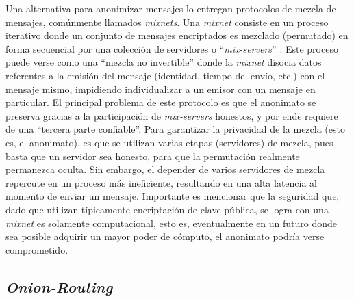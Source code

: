 Una alternativa para anonimizar mensajes lo entregan protocolos de mezcla de mensajes, comúnmente llamados \emph{mixnets}. 
Una \emph{mixnet} consiste en un proceso iterativo donde un conjunto de mensajes encriptados es mezclado (permutado) en forma 
secuencial por una colección de servidores o ``\emph{mix-servers}'' \cite{chaum1981untraceable}. Este proceso puede verse como una 
``mezcla no invertible'' donde la \emph{mixnet} disocia datos referentes a la emisión del 
mensaje (identidad, tiempo del envío, etc.) con el mensaje mismo, impidiendo individualizar a un emisor con un mensaje en particular. 
El principal problema de este protocolo es que el anonimato se preserva gracias a la participación de \emph{mix-servers} honestos, 
y por ende requiere de una ``tercera parte confiable''. 
Para garantizar la privacidad de la mezcla (esto es, el anonimato), es que se utilizan varias etapas (servidores) de mezcla, pues 
basta que un servidor sea honesto, para que la permutación realmente permanezca oculta. Sin embargo, el depender de varios servidores 
de mezcla repercute en un proceso más ineficiente, resultando en una alta latencia al momento de enviar 
un mensaje. Importante es mencionar que la seguridad que, dado que utilizan típicamente encriptación de clave pública, se logra con 
una \emph{mixnet} es solamente computacional, esto es, eventualmente en un 
futuro donde sea posible adquirir un mayor poder de cómputo, el anonimato podría verse comprometido.

\subsection{\emph{Onion-Routing}}

